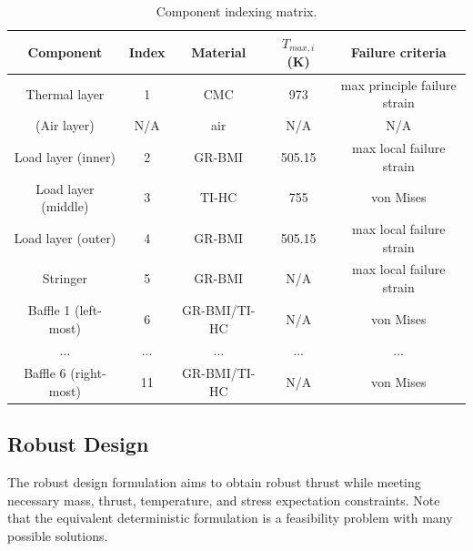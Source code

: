\documentclass{article}
\begin{document}
\begin{table}
\caption[Component indexing matrix]{Component indexing matrix.}
\label{tab:componentIndexing}
\begin{center}
\begin{tabular}[]{ c | c | c | c | c }
\textbf{Component} & \textbf{Index} & \textbf{Material} & \textbf{$T_{max,i}$} (K) & \textbf{Failure criteria} \\ \hline
Thermal layer & 1 & CMC & 973 & max principle failure strain \\ \hline
(Air layer) & N/A & air & N/A & N/A \\ \hline
Load layer (inner) & 2 & GR-BMI & 505.15 & max local failure strain \\ \hline
Load layer (middle) & 3 & TI-HC & 755 & von Mises \\ \hline
Load layer (outer) & 4 & GR-BMI & 505.15 & max local failure strain \\ \hline
Stringer & 5 & GR-BMI & N/A & max local failure strain \\ \hline
Baffle 1 (left-most) & 6 & GR-BMI/TI-HC & N/A & von Mises \\ \hline
$\ldots$ & $\ldots$ & $\ldots$ & $\ldots$ & $\ldots$ \\ \hline
Baffle 6 (right-most) & 11 & GR-BMI/TI-HC & N/A & von Mises \\ \hline
\end{tabular}
\end{center}
\end{table}

\pagebreak
\subsection{Robust Design}

The robust design formulation aims to obtain robust thrust while meeting necessary mass, thrust, temperature, and stress expectation constraints. Note that the equivalent deterministic formulation is a feasibility problem with many possible solutions.
\end{document}
